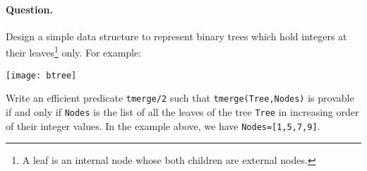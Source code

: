 
\paragraph{Question.} Design a simple data structure to represent
binary trees which hold integers at their leaves\footnote{A leaf is an
internal node whose both children are external nodes.} only. For
example:
\begin{center}
\texttt{[image: btree]}
\end{center}
Write an efficient predicate \texttt{tmerge/2} such
that \texttt{tmerge(Tree,Nodes)} is provable if and only if
\texttt{Nodes} is the list of all the leaves of the tree \texttt{Tree}
in increasing order of their integer values. In the example
above, we have \texttt{Nodes=[1,5,7,9]}.

